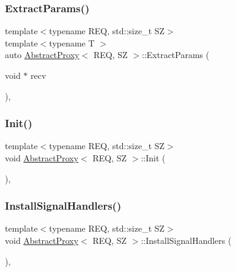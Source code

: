 \mbox{\label{classAbstractProxy_a64cad7553939288e10994b4a7fc2557f}} 
\subsubsection{\texorpdfstring{Extract\+Params()}{ExtractParams()}}
{\footnotesize\ttfamily template$<$typename R\+EQ, std\+::size\+\_\+t SZ$>$ \\
template$<$typename T $>$ \\
auto \hyperlink{classAbstractProxy}{Abstract\+Proxy}$<$ R\+EQ, SZ $>$\+::Extract\+Params (\begin{DoxyParamCaption}\item[{void $\ast$}]{recv }\end{DoxyParamCaption})\hspace{0.3cm}{\ttfamily [inline]}, {\ttfamily [protected]}}

\mbox{\label{classAbstractProxy_a9d411fc2a8ff05b6cbf47b2152578e2a}} 
\subsubsection{\texorpdfstring{Init()}{Init()}}
{\footnotesize\ttfamily template$<$typename R\+EQ, std\+::size\+\_\+t SZ$>$ \\
void \hyperlink{classAbstractProxy}{Abstract\+Proxy}$<$ R\+EQ, SZ $>$\+::Init (\begin{DoxyParamCaption}{ }\end{DoxyParamCaption})\hspace{0.3cm}{\ttfamily [inline]}, {\ttfamily [protected]}}

\mbox{\label{classAbstractProxy_a9f368f0e76ba153626f0db982ebe389c}} 
\subsubsection{\texorpdfstring{Install\+Signal\+Handlers()}{InstallSignalHandlers()}}
{\footnotesize\ttfamily template$<$typename R\+EQ, std\+::size\+\_\+t SZ$>$ \\
void \hyperlink{classAbstractProxy}{Abstract\+Proxy}$<$ R\+EQ, SZ $>$\+::Install\+Signal\+Handlers (\begin{DoxyParamCaption}{ }\end{DoxyParamCaption})\hspace{0.3cm}{\ttfamily [inline]}, {\ttfamily [protected]}}

